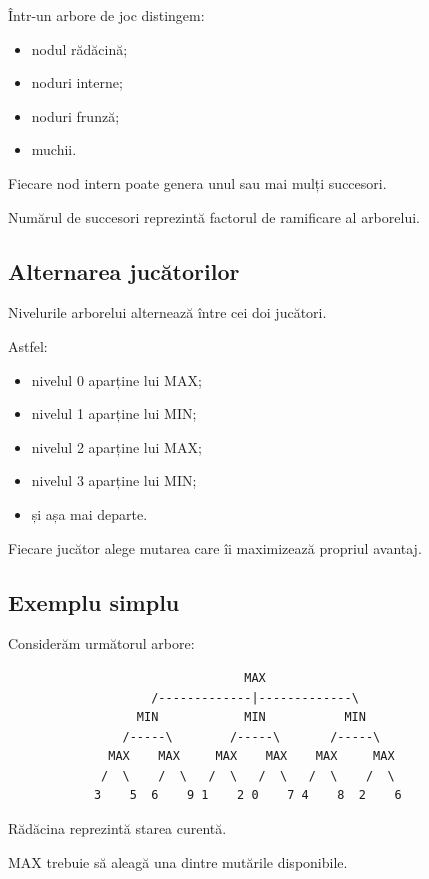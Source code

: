 \documentclass[12pt,a4paper]{article}
\begin{document}
Într-un arbore de joc distingem:

\begin{itemize}
\item nodul rădăcină;
\item noduri interne;
\item noduri frunză;
\item muchii.
\end{itemize}

Fiecare nod intern poate genera unul sau mai mulți succesori.

Numărul de succesori reprezintă factorul de ramificare al arborelui.

\subsection{Alternarea jucătorilor}

Nivelurile arborelui alternează între cei doi jucători.

Astfel:

\begin{itemize}
\item nivelul 0 aparține lui MAX;
\item nivelul 1 aparține lui MIN;
\item nivelul 2 aparține lui MAX;
\item nivelul 3 aparține lui MIN;
\item și așa mai departe.
\end{itemize}

Fiecare jucător alege mutarea care îi maximizează propriul avantaj.

\subsection{Exemplu simplu}

Considerăm următorul arbore:

\begin{verbatim}
                                 MAX
                    /-------------|-------------\
                  MIN            MIN           MIN
                /-----\        /-----\       /-----\
              MAX    MAX     MAX    MAX    MAX     MAX
             /  \    /  \   /  \   /  \   /  \    /  \
            3    5  6    9 1    2 0    7 4    8  2    6
\end{verbatim}

Rădăcina reprezintă starea curentă.

MAX trebuie să aleagă una dintre mutările disponibile.
\end{document}
